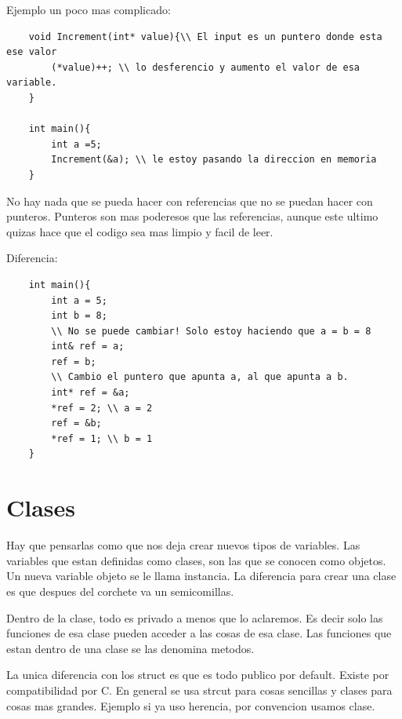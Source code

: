 \documentclass[11pt]{article}
\begin{document}
Ejemplo un poco mas complicado:
\begin{lstlisting}
    void Increment(int* value){\\ El input es un puntero donde esta ese valor
        (*value)++; \\ lo desferencio y aumento el valor de esa variable.
    }

    int main(){
        int a =5;
        Increment(&a); \\ le estoy pasando la direccion en memoria
    }
\end{lstlisting}

No hay nada que se pueda hacer con referencias que no se puedan hacer con punteros.
Punteros son mas poderesos que las referencias, aunque este ultimo quizas hace
que el codigo sea mas limpio y facil de leer.

Diferencia:
\begin{lstlisting}
    int main(){
        int a = 5;
        int b = 8;
        \\ No se puede cambiar! Solo estoy haciendo que a = b = 8
        int& ref = a;
        ref = b;
        \\ Cambio el puntero que apunta a, al que apunta a b.
        int* ref = &a;
        *ref = 2; \\ a = 2
        ref = &b;
        *ref = 1; \\ b = 1
    }
\end{lstlisting}

\section{Clases}
Hay que pensarlas como que nos deja crear nuevos tipos de variables.
Las variables que estan definidas como clases, son las que se conocen como objetos.
Un nueva variable objeto se le llama instancia.
La diferencia para crear una clase es que despues del corchete va un semicomillas.

Dentro de la clase, todo es privado a menos que lo aclaremos.
Es decir solo las funciones de esa clase pueden acceder a las cosas de esa clase.
Las funciones que estan dentro de una clase se las denomina metodos.

La unica diferencia con los struct es que es todo publico por default.
Existe por compatibilidad por C.
En general se usa strcut para cosas sencillas y clases para cosas mas grandes.
Ejemplo si ya uso herencia, por convencion usamos clase.
\end{document}

